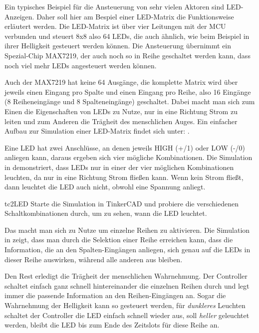 \begin{multicols}{2}
Ein typisches Beispiel für die Ansteuerung von sehr vielen Aktoren sind LED-Anzeigen. Daher soll hier am 
Bespiel einer LED-Matrix die Funktionsweise erläutert werden. Die LED-Matrix ist über vier Leitungen mit der
MCU verbunden und steuert 8x8 also 64 LEDs, die auch ähnlich, wie beim Beispiel  in
ihrer Helligkeit gesteuert werden können. Die Ansteuerung übernimmt ein Spezial-Chip MAX7219, der auch noch
so in Reihe geschaltet werden kann, dass noch viel mehr LEDs angesteuert werden können. 

\vfill\null\pagebreak
{}

Auch der MAX7219 hat keine 64 Ausgänge, die komplette Matrix wird über jeweils einen Eingang pro Spalte und einen
Eingang pro Reihe, also 16 Eingänge (8 Reiheneingänge und 8 Spalteneingänge) geschaltet. Dabei macht man sich zum 
Einen die Eigenschaften von LEDs zu Nutze, nur in eine Richtung Strom zu leiten und zum Anderen die Trägheit 
des menschlichen Auges. Ein einfacher Aufbau zur Simulation einer LED-Matrix findet sich unter:
.

Eine LED hat zwei Anschlüsse, an denen jeweils HIGH (+/1) oder LOW (-/0) anliegen kann, daraus ergeben sich
vier mögliche Kombinationen.
Die Simulation in  demonstriert, dass LEDs nur in einer der vier möglichen 
Kombinationen leuchten, da nur in eine Richtung Strom fließen kann. Wenn kein Strom fließt, dann leuchtet
die LED auch nicht, obwohl eine Spannung anliegt.

\begin{excercise}{tc2}{LED}
Starte die Simulation in TinkerCAD und probiere die verschiedenen Schaltkombinationen durch, um zu sehen,
wann die LED leuchtet.
\end{excercise}



Das macht man sich zu Nutze um einzelne Reihen zu aktivieren. 
Die Simulation in  zeigt, dass man durch die Selektion einer Reihe erreichen kann, 
dass die Information, die an den Spalten-Eingängen anliegen, sich genau auf die LEDs in dieser Reihe 
auswirken, während alle anderen aus bleiben.

Den Rest erledigt die Trägheit der menschlichen Wahrnehmung. Der Controller schaltet einfach ganz schnell 
hintereinander die einzelnen Reihen durch und legt immer die passende Information an den Reihen-Eingängen an. 
Sogar die Wahrnehmung der Helligkeit kann so gesteuert werden, für \textit{dunkleres} Leuchten schaltet der 
Controller die LED einfach schnell wieder aus, soll \textit{heller} geleuchtet werden, bleibt die LED bis
zum Ende des Zeitslots für diese Reihe an.


\end{multicols}

